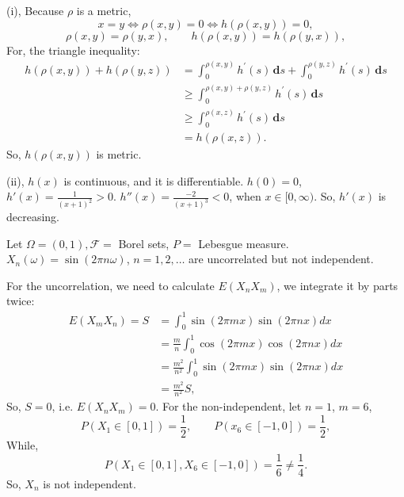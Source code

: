 \documentclass[en, normal, 11pt, black]{elegantnote}
\newenvironment{exercise}[1]{\begin{tcolorbox}[colback=black!15, colframe=black!80, breakable, title=#1]}{\end{tcolorbox}}
\renewenvironment{proof}{\begin{tcolorbox}[colback=white, colframe=black!50, breakable, title=Proof. ]\setlength{\parskip}{0.8em}}{\,\\\rightline{$\square$}\end{tcolorbox}}
\newcommand{\der}{\,\mathbf{d}}
\begin{document}
    \begin{proof}
        (i), Because $\rho$ is a metric, 
        \[
            x=y\Leftrightarrow\rho(x,y)=0\Leftrightarrow h(\rho(x,y))=0, 
        \]
        \[\rho(x,y)=\rho(y,x),\qquad h(\rho(x,y))=h(\rho(y,x)), \]
        For, the triangle inequality: 
        \[
            \begin{aligned}
            h(\rho(x, y))+h(\rho(y, z)) &=\int_{0}^{\rho(x, y)} h^{\prime}(s) \der s+\int_{0}^{\rho(y, z)} h^{\prime}(s) \der s \\
            & \geqslant \int_{0}^{\rho(x, y)+\rho(y, z)} h^{\prime}(s) \der s \\
            & \geqslant \int_{0}^{\rho(x, z)} h^{\prime}(s) \der s\\
            &=h(\rho(x, z)). 
            \end{aligned}
        \]
        So, $h(\rho(x,y))$ is metric. 

        (ii), $h(x)$ is continuous, and it is differentiable. $h(0)=0$, $h'(x)=\frac{1}{(x+1)^2}>0$. $h''(x)=\frac{-2}{(x+1)^3}<0$, when $x\in[0,\infty)$. So, $h'(x)$ is decreasing. 
    \end{proof}

    \begin{exercise}{2.1.4}
        Let $\Omega=(0,1), \mathcal{F}=$ Borel sets, $P=$ Lebesgue measure. $X_{n}(\omega)=\sin (2 \pi n \omega)$, $n=1,2, \ldots$ are uncorrelated but not independent. 
    \end{exercise}

    \begin{proof}
        For the uncorrelation, we need to calculate $E(X_nX_m)$, we integrate it by parts twice: 
        \[
            \begin{aligned}
                E (X_{m} X_{n})=S &=\int_{0}^{1} \sin (2 \pi m x) \sin (2 \pi n x) d x \\
                &=\frac{m}{n} \int_{0}^{1} \cos (2 \pi m x) \cos (2 \pi n x) d x \\
                &=\frac{m^{2}}{n^{2}} \int_{0}^{1} \sin (2 \pi m x) \sin (2 \pi n x) d x\\
                &=\frac{m^2}{n^2}S, 
            \end{aligned}
        \]
        So, $S=0$, i.e. $E(X_nX_m)=0$. For the non-independent, let $n=1$, $m=6$, 
        \[P(X_1\in[0,1])=\frac{1}{2},\qquad P(x_6\in[-1,0])=\frac{1}{2}, \]
        While, 
        \[P(X_1\in[0,1], X_6\in[-1,0])=\frac{1}{6}\not=\frac{1}{4}. \]
        So, $X_n$ is not independent. 
    \end{proof}
\end{document}
